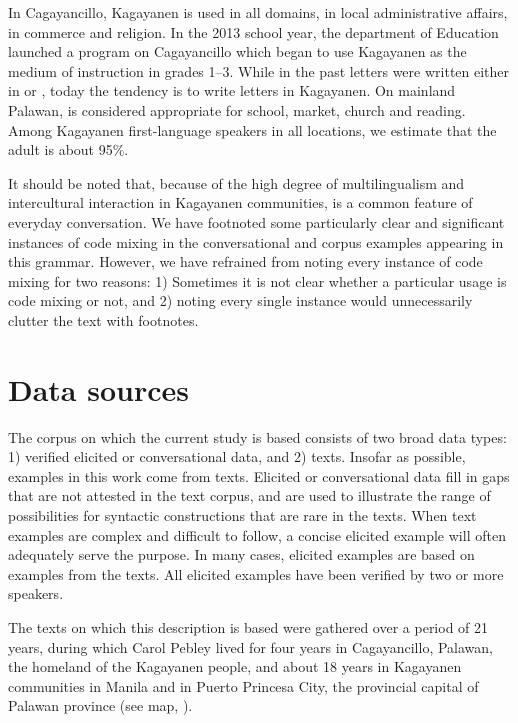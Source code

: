 In Cagayancillo, Kagayanen is used in all domains, in local administrative affairs, in commerce and religion. In the 2013 school  year, the department of Education launched a  program on Cagayancillo which began to use Kagayanen as the medium of instruction in grades 1--3. While in the past letters were written either in  or , today the tendency is to write letters in Kagayanen. On mainland Palawan,  is considered appropriate for school, market, church and reading. Among Kagayanen first-language speakers in all locations, we estimate that the adult  is about 95\%. 

It should be noted that, because of the high degree of multilingualism and intercultural interaction in Kagayanen communities,  is a common feature of everyday conversation. We have footnoted some particularly clear and significant instances of code mixing in the conversational and corpus examples appearing in this grammar. However, we have refrained from noting every instance of code mixing for two reasons: 1) Sometimes it is not clear whether a particular usage is code mixing or not, and 2) noting every single instance would unnecessarily clutter the text with footnotes. 

\section{Data sources}\label{sec:1.4} \label{sec:datasources}
\largerpage

The corpus on which the current study is based consists of two broad data types: 1) verified elicited or conversational data, and 2) texts. Insofar as possible, examples in this work come from texts. Elicited or conversational data fill in gaps that are not attested in the text corpus, and are used to illustrate the range of possibilities for syntactic constructions that are rare in the texts. When text examples are complex and difficult to follow, a concise elicited example will often adequately serve the purpose. In many cases, elicited examples are based on examples from the texts. All elicited examples have been verified by two or more speakers.

The texts on which this description is based were gathered over a period of 21 years, during which Carol Pebley lived for four years in Cagayancillo, Palawan, the homeland of the Kagayanen people, and about 18 years in Kagayanen communities in Manila and in Puerto Princesa City, the provincial capital of Palawan province (see map, ).

